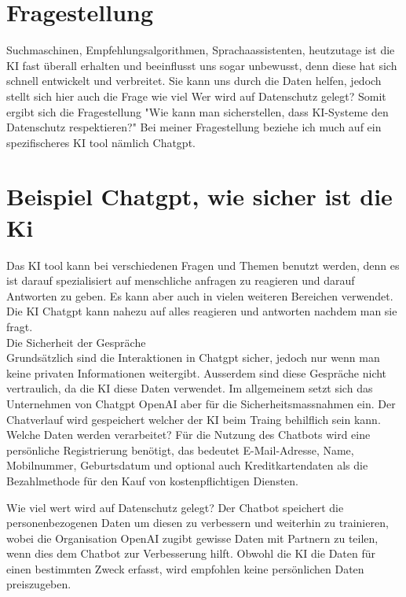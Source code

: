 \documentclass{article}
\begin{document}
    \section{Fragestellung}
    Suchmaschinen, Empfehlungsalgorithmen, Sprachaassistenten, heutzutage ist die KI fast überall erhalten und beeinflusst uns sogar unbewusst, denn diese hat sich schnell entwickelt und verbreitet. 
    Sie kann uns durch die Daten helfen, jedoch stellt sich hier auch die Frage wie viel Wer wird auf Datenschutz gelegt? 
    Somit ergibt sich die Fragestellung "Wie kann man sicherstellen, dass KI-Systeme den Datenschutz respektieren?"
    Bei meiner Fragestellung beziehe ich much auf ein spezifischeres KI tool nämlich Chatgpt. 
\\


\section{Beispiel Chatgpt, wie sicher ist die Ki}

    Das KI tool kann bei verschiedenen Fragen und Themen benutzt werden, denn es ist darauf spezialisiert auf menschliche anfragen zu reagieren und darauf Antworten zu geben. 
    Es kann aber auch in vielen weiteren Bereichen verwendet.\\
    Die KI Chatgpt kann nahezu auf alles reagieren und antworten nachdem man sie fragt. 
\\
    Die Sicherheit der Gespräche \\
    Grundsätzlich sind die Interaktionen in Chatgpt sicher, jedoch nur wenn man keine privaten Informationen weitergibt. Ausserdem sind diese Gespräche nicht vertraulich, da die KI diese Daten verwendet.
    Im allgemeinem setzt sich das Unternehmen von Chatgpt OpenAI aber für die Sicherheitsmassnahmen ein.
    Der Chatverlauf wird gespeichert welcher der KI beim Traing behilflich sein kann.
    Welche Daten werden verarbeitet? 
    Für die Nutzung des Chatbots wird eine persönliche Registrierung benötigt, das bedeutet E-Mail-Adresse, Name, Mobilnummer, Geburtsdatum und optional auch Kreditkartendaten als die Bezahlmethode für den Kauf von kostenpflichtigen Diensten.

    Wie viel wert wird auf Datenschutz gelegt?
    Der Chatbot speichert die personenbezogenen Daten um diesen zu verbessern und weiterhin zu trainieren, wobei die Organisation OpenAI zugibt gewisse Daten mit Partnern zu teilen, wenn dies dem Chatbot zur Verbesserung hilft.
    Obwohl die KI die Daten für einen bestimmten Zweck erfasst, wird empfohlen keine persönlichen Daten preiszugeben.
\end{document}
